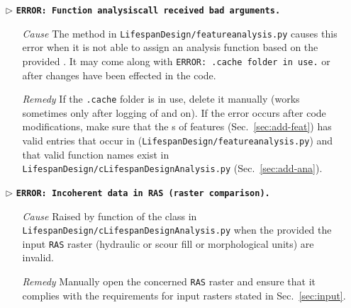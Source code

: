 \begin{itemize}
	\item[$\triangleright$] \textbf{\texttt{ERROR: Function analysis{\myUnderscore}call received bad arguments.}}
	\begin{itemize}
		\item[\textit{Cause}\hspace{0.27cm}] The  method in \texttt{LifespanDesign/feature{\myUnderscore}analysis.py} causes this error when it is not able to assign an analysis function based on the provided . It may come along with \texttt{ERROR: .cache folder in use.} or after changes have been effected in the code.
		\item[\textit{Remedy}] If the \texttt{.cache} folder is in use, delete it manually (works sometimes only after logging of and on). If the error occurs after code modifications, make sure that the s of features (Sec.~\ref{sec:add-feat}) has valid entries that occur in  (\texttt{LifespanDesign/feature{\myUnderscore}analysis.py}) and that valid function names exist in \texttt{LifespanDesign/cLifespanDesignAnalysis.py} (Sec.~\ref{sec:add-ana}).\\
	\end{itemize}
	
	\item[$\triangleright$]\textbf{\texttt{ERROR: Incoherent data in RAS (raster comparison).}}
	\begin{itemize}
		\item[\textit{Cause}\hspace{0.27cm}] Raised by  function of the  class in \texttt{LifespanDesign/cLifespanDesignAnalysis.py} when the provided the input \texttt{RAS} raster (hydraulic or scour fill or morphological units) are invalid.
		\item[\textit{Remedy}] Manually open the concerned \texttt{RAS} raster and ensure that it complies with the requirements for input rasters stated in Sec.~\ref{sec:input}.\\
	\end{itemize}	
	

\end{itemize}
